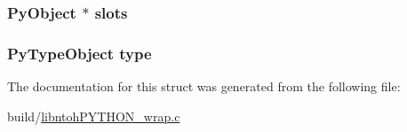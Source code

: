 \hypertarget{struct_py_heap_type_object_a7127cc956fe3cde2a6dddc6f50345417}{
\subsubsection[{slots}]{\setlength{\rightskip}{0pt plus 5cm}Py\-Object $\ast$ slots}}\label{struct_py_heap_type_object_a7127cc956fe3cde2a6dddc6f50345417}
\hypertarget{struct_py_heap_type_object_ab95029e45ed9e584a319da3910e6d36a}{
\subsubsection[{type}]{\setlength{\rightskip}{0pt plus 5cm}Py\-Type\-Object type}}\label{struct_py_heap_type_object_ab95029e45ed9e584a319da3910e6d36a}


The documentation for this struct was generated from the following file\-:\begin{DoxyCompactItemize}
\item 
build/\hyperlink{libntoh_p_y_t_h_o_n__wrap_8c}{libntoh\-P\-Y\-T\-H\-O\-N\-\_\-wrap.\-c}\end{DoxyCompactItemize}

